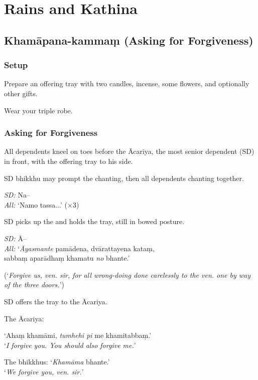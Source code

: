 \chapter{Rains and Kathina}

\section{Khamāpana-kammaṃ (Asking for Forgiveness)}

\subsection{Setup}

Prepare an offering tray with two candles, incense, some flowers, and optionally
other gifts.

Wear your triple robe.

\subsection{Asking for Forgiveness}

All dependents kneel on toes before the Ācariya, the most senior dependent (SD)
in front, with the offering tray to his side.


SD bhikkhu may prompt the chanting, then all dependents chanting together.

\emph{SD:} Na--\\
\emph{All:} ‘Namo tassa...’ (×3)

SD picks up the and holds the tray, still in bowed posture.

\emph{SD:} Ā--\\
\emph{All:} ‘\emph{Āyasmante} pamādena, dvārattayena kataṃ,\\ sabbaṃ aparādhaṃ khamatu \emph{no} bhante.’

(‘\emph{Forgive us, ven. sir, for all wrong-doing done carelessly to the ven. one by way of the three doors.}’)

SD offers the tray to the Ācariya.

The Ācariya:

‘Ahaṃ khamāmi, \emph{tumhehi pi} me khamitabbaṃ.’\\
‘\emph{I forgive you. You should also forgive me.}’

The bhikkhus: ‘\emph{Khamāma} bhante.’\\
‘\emph{We forgive you, ven. sir.}’

